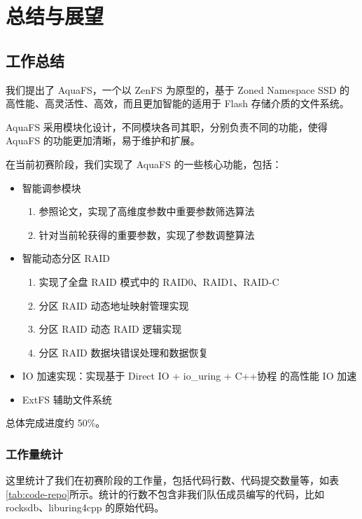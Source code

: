 \section{总结与展望}

\subsection{工作总结}

我们提出了 AquaFS，一个以 ZenFS 为原型的，基于 Zoned Namespace SSD 的高性能、高灵活性、高效，而且更加智能的适用于 Flash 存储介质的文件系统。

AquaFS 采用模块化设计，不同模块各司其职，分别负责不同的功能，使得 AquaFS 的功能更加清晰，易于维护和扩展。

在当前初赛阶段，我们实现了 AquaFS 的一些核心功能，包括：

\begin{itemize}
  \item 智能调参模块
  \begin{enumerate}
    \item 参照论文\cite{mahmud_confd_nodate}，实现了高维度参数中重要参数筛选算法
    \item 针对当前轮获得的重要参数，实现了参数调整算法
  \end{enumerate}
  \item 智能动态分区 RAID
  \begin{enumerate}
    \item 实现了全盘 RAID 模式中的 RAID0、RAID1、RAID-C
    \item 分区 RAID 动态地址映射管理实现
    \item 分区 RAID 动态 RAID 逻辑实现
    \item 分区 RAID 数据块错误处理和数据恢复
  \end{enumerate}
  \item IO 加速实现：实现基于 Direct IO + io\_uring + C++协程 的高性能 IO 加速
  \item ExtFS 辅助文件系统
\end{itemize}

总体完成进度约 50\%。

\subsubsection*{工作量统计}

这里统计了我们在初赛阶段的工作量，包括代码行数、代码提交数量等，如表\ref{tab:code-repo}所示。统计的行数不包含非我们队伍成员编写的代码，比如 rocksdb、liburing4cpp 的原始代码。

